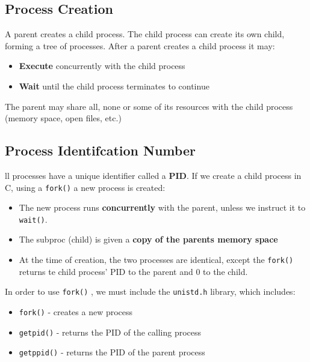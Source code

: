 \documentclass[a4paper, 10pt]{article}
\begin{document}
\subsection{Process Creation}
A parent creates a child process. The child process can create its own child, forming a tree of processes. After a parent creates a child process it may:
\begin{itemize}
    \item \textbf{Execute} concurrently with the child process
    \item \textbf{Wait} until the child process terminates to continue
\end{itemize}
The parent may share all, none or some of its resources with the child process (memory space, open files, etc.)
\subsection{Process Identifcation Number}
ll processes have a unique identifier called a \textbf{PID}. If we create a child process in C, using a \texttt{fork()} a new process is created:
\begin{itemize}
    \item The new process runs \textbf{concurrently} with the parent, unless we instruct it to \texttt{wait()}.
    \item The subproc (child) is given a \textbf{copy of the parents memory space}
    \item At the time of creation, the two processes are identical, except the \texttt{fork()} returns te child process' PID to the parent and 0 to the child.
\end{itemize}
In order to use \texttt{fork()} , we must include the \texttt{unistd.h} library, which includes:
\begin{itemize}
    \item \texttt{fork()} - creates a new process
    \item \texttt{getpid()} - returns the PID of the calling process
    \item \texttt{getppid()} - returns the PID of the parent process
\end{itemize}
\end{document}
